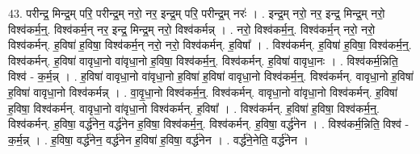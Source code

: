 \documentclass[17pt]{extarticle}
\begin{document}
43. परीन्द्र॒ मिन्द्र॒म् परि॒ परीन्द्र॒म् नरो॒ नर॒ इन्द्र॒म् परि॒ परीन्द्र॒म् नरः॑ । . इन्द्र॒म् नरो॒ नर॒ इन्द्र॒ मिन्द्र॒म् नरो॒ विश्व॑कर्म॒न्॒. विश्व॑कर्म॒न् नर॒ इन्द्र॒ मिन्द्र॒म् नरो॒ विश्व॑कर्मन्न् । . नरो॒ विश्व॑कर्म॒न्॒. विश्व॑कर्म॒न् नरो॒ नरो॒ विश्व॑कर्मन्. ह॒विषा॑ ह॒विषा॒ विश्व॑कर्म॒न् नरो॒ नरो॒ विश्व॑कर्मन्. ह॒विषा᳚ । . विश्व॑कर्मन्. ह॒विषा॑ ह॒विषा॒ विश्व॑कर्म॒न्॒. विश्व॑कर्मन्. ह॒विषा॑ वावृधा॒नो वा॑वृधा॒नो ह॒विषा॒ विश्व॑कर्म॒न्॒. विश्व॑कर्मन्. ह॒विषा॑ वावृधा॒नः । . विश्व॑कर्म॒न्निति॒ विश्व॑ - क॒र्म॒न्न् । . ह॒विषा॑ वावृधा॒नो वा॑वृधा॒नो ह॒विषा॑ ह॒विषा॑ वावृधा॒नो विश्व॑कर्म॒न्॒. विश्व॑कर्मन्. वावृधा॒नो ह॒विषा॑ ह॒विषा॑ वावृधा॒नो विश्व॑कर्मन्न् । . वा॒वृ॒धा॒नो विश्व॑कर्म॒न्॒. विश्व॑कर्मन्. वावृधा॒नो वा॑वृधा॒नो विश्व॑कर्मन्. ह॒विषा॑ ह॒विषा॒ विश्व॑कर्मन्. वावृधा॒नो वा॑वृधा॒नो विश्व॑कर्मन्. ह॒विषा᳚ । . विश्व॑कर्मन्. ह॒विषा॑ ह॒विषा॒ विश्व॑कर्म॒न्॒. विश्व॑कर्मन्. ह॒विषा॒ वर्द्ध॑नेन॒ वर्द्ध॑नेन ह॒विषा॒ विश्व॑कर्म॒न्॒. विश्व॑कर्मन्. ह॒विषा॒ वर्द्ध॑नेन । . विश्व॑कर्म॒न्निति॒ विश्व॑ - क॒र्म॒न्न् । . ह॒विषा॒ वर्द्ध॑नेन॒ वर्द्ध॑नेन ह॒विषा॑ ह॒विषा॒ वर्द्ध॑नेन । . वर्द्ध॑ने॒नेति॒ वर्द्ध॑नेन । \newline
\pagebreak
\end{document}
